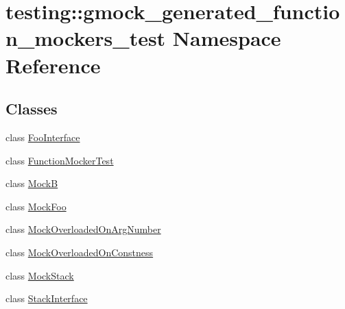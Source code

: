 \hypertarget{namespacetesting_1_1gmock__generated__function__mockers__test}{}\section{testing\+:\+:gmock\+\_\+generated\+\_\+function\+\_\+mockers\+\_\+test Namespace Reference}
\label{namespacetesting_1_1gmock__generated__function__mockers__test}
\subsection*{Classes}
\begin{DoxyCompactItemize}
\item 
class \hyperlink{classtesting_1_1gmock__generated__function__mockers__test_1_1_foo_interface}{Foo\+Interface}
\item 
class \hyperlink{classtesting_1_1gmock__generated__function__mockers__test_1_1_function_mocker_test}{Function\+Mocker\+Test}
\item 
class \hyperlink{classtesting_1_1gmock__generated__function__mockers__test_1_1_mock_b}{MockB}
\item 
class \hyperlink{classtesting_1_1gmock__generated__function__mockers__test_1_1_mock_foo}{Mock\+Foo}
\item 
class \hyperlink{classtesting_1_1gmock__generated__function__mockers__test_1_1_mock_overloaded_on_arg_number}{Mock\+Overloaded\+On\+Arg\+Number}
\item 
class \hyperlink{classtesting_1_1gmock__generated__function__mockers__test_1_1_mock_overloaded_on_constness}{Mock\+Overloaded\+On\+Constness}
\item 
class \hyperlink{classtesting_1_1gmock__generated__function__mockers__test_1_1_mock_stack}{Mock\+Stack}
\item 
class \hyperlink{classtesting_1_1gmock__generated__function__mockers__test_1_1_stack_interface}{Stack\+Interface}
\end{DoxyCompactItemize}
